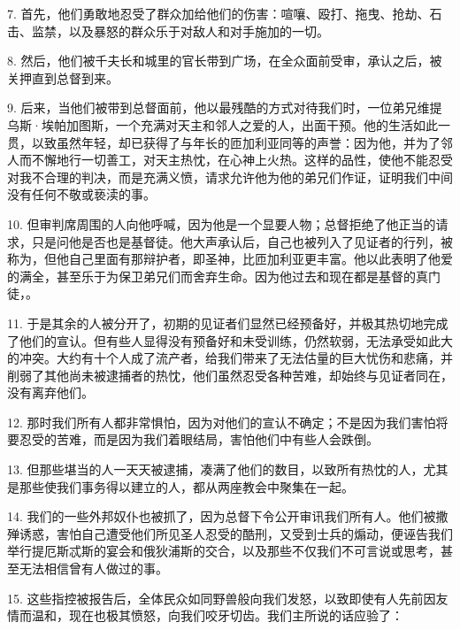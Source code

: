 7. 首先，他们勇敢地忍受了群众加给他们的伤害：喧嚷、殴打、拖曳、抢劫、石击、监禁，以及暴怒的群众乐于对敌人和对手施加的一切。\par

8. 然后，他们被千夫长和城里的官长带到广场，在全众面前受审，承认之后，被关押直到总督到来。\par

9. 后来，当他们被带到总督面前，他以最残酷的方式对待我们时，一位弟兄维提乌斯·埃帕加图斯，一个充满对天主和邻人之爱的人，出面干预。他的生活如此一贯，以致虽然年轻，却已获得了与年长的匝加利亚同等的声誉：因为他，并为了邻人而不懈地行一切善工，对天主热忱，在心神上火热。这样的品性，使他不能忍受对我不合理的判决，而是充满义愤，请求允许他为他的弟兄们作证，证明我们中间没有任何不敬或亵渎的事。\par

10. 但审判席周围的人向他呼喊，因为他是一个显要人物；总督拒绝了他正当的请求，只是问他是否也是基督徒。他大声承认后，自己也被列入了见证者的行列，被称为，但他自己里面有那辩护者，即圣神，比匝加利亚更丰富。他以此表明了他爱的满全，甚至乐于为保卫弟兄们而舍弃生命。因为他过去和现在都是基督的真门徒，。\par

11. 于是其余的人被分开了，初期的见证者们显然已经预备好，并极其热切地完成了他们的宣认。但有些人显得没有预备好和未受训练，仍然软弱，无法承受如此大的冲突。大约有十个人成了流产者，给我们带来了无法估量的巨大忧伤和悲痛，并削弱了其他尚未被逮捕者的热忱，他们虽然忍受各种苦难，却始终与见证者同在，没有离弃他们。\par

12. 那时我们所有人都非常惧怕，因为对他们的宣认不确定；不是因为我们害怕将要忍受的苦难，而是因为我们着眼结局，害怕他们中有些人会跌倒。\par

13. 但那些堪当的人一天天被逮捕，凑满了他们的数目，以致所有热忱的人，尤其是那些使我们事务得以建立的人，都从两座教会中聚集在一起。\par

14. 我们的一些外邦奴仆也被抓了，因为总督下令公开审讯我们所有人。他们被撒殚诱惑，害怕自己遭受他们所见圣人忍受的酷刑，又受到士兵的煽动，便诬告我们举行提厄斯忒斯的宴会和俄狄浦斯的交合，以及那些不仅我们不可言说或思考，甚至无法相信曾有人做过的事。\par

15. 这些指控被报告后，全体民众如同野兽般向我们发怒，以致即使有人先前因友情而温和，现在也极其愤怒，向我们咬牙切齿。我们主所说的话应验了：\par

